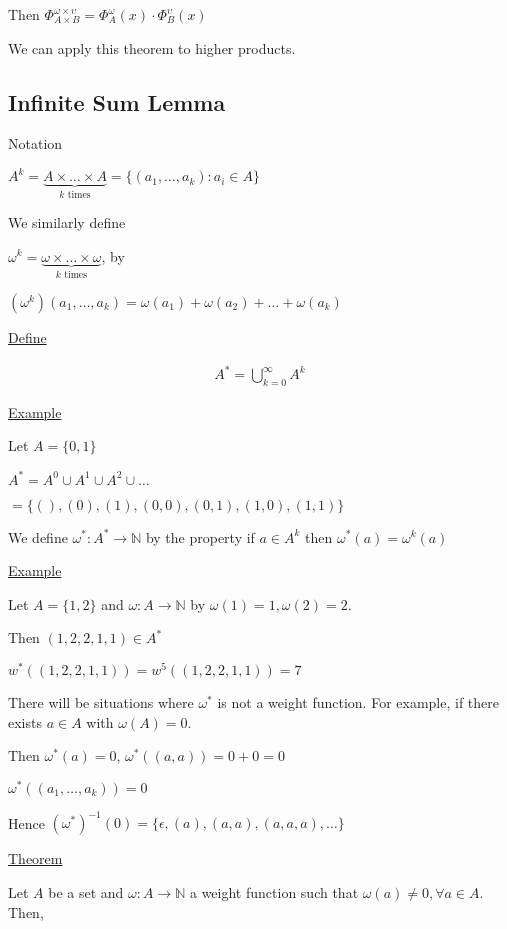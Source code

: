 \documentclass{article}
\begin{document}
Then $\Phi_{A \times B}^{\omega \times \upsilon} = \Phi_{A}^{\omega}(x) \cdot \Phi_{B}^{\upsilon}(x)$

We can apply this theorem to higher products.

\subsection{Infinite Sum Lemma}

Notation

$A^k = \underbrace{A \times \ldots \times A}_{k \text{ times}} = \{(a_1,\ldots,a_k):a_i \in A\}$

We similarly define

$\omega^k = \underbrace{\omega \times \ldots \times \omega}_{k \text{ times}}$, by

$(\omega^k)(a_1, \ldots, a_k) = \omega(a_1) + \omega(a_2) + \ldots + \omega(a_k)$

\underline{Define}

\begin{align*}
A^* = \bigcup_{k=0}^{\infty}A^k
\end{align*}

\underline{Example}

Let $A = \{0,1\}$

$A^* = A^0 \cup A^1 \cup A^2 \cup \ldots$

$ = \{(),(0),(1),(0,0),(0,1),(1,0),(1,1)\}$

We define $\omega^{*} : A^{*} \to \mathbb{N}$ by the property if $a \in A^{k}$ then $\omega^{*}(a) = \omega^{k}(a)$

\underline{Example}

Let $A = \{1,2\}$ and $\omega: A \to \mathbb{N}$ by $\omega(1) = 1, \omega(2) = 2$.

Then $(1,2,2,1,1) \in A^*$

$w^*((1,2,2,1,1)) = w^5((1,2,2,1,1)) = 7$

There will be situations where $\omega^*$ is not a weight function. For example, if there exists $a \in A$ with $\omega(A) = 0$.

Then $\omega^*(a)=0$, $\omega^*((a,a)) = 0+0=0$

$\omega^*((a_1,\ldots,a_k)) = 0$

Hence $(\omega^*)^{-1}(0) = \{\epsilon, (a),(a,a),(a,a,a),\ldots\}$

\underline{Theorem}

Let $A$ be a set and $\omega: A \to \mathbb{N}$ a weight function such that $\omega(a) \ne 0, \forall a \in A$. Then,
\end{document}

